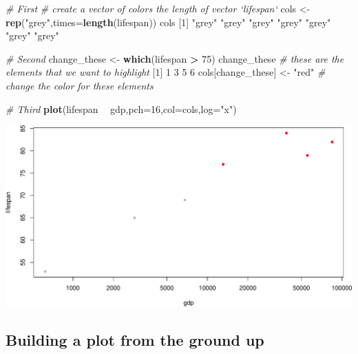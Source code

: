 \documentclass[]{book}
\newenvironment{Shaded}{\begin{snugshade}}{\end{snugshade}}
\newcommand{\CommentTok}[1]{\textcolor[rgb]{0.56,0.35,0.01}{\textit{#1}}}
\newcommand{\DataTypeTok}[1]{\textcolor[rgb]{0.13,0.29,0.53}{#1}}
\newcommand{\DecValTok}[1]{\textcolor[rgb]{0.00,0.00,0.81}{#1}}
\newcommand{\KeywordTok}[1]{\textcolor[rgb]{0.13,0.29,0.53}{\textbf{#1}}}
\newcommand{\NormalTok}[1]{#1}
\newcommand{\OperatorTok}[1]{\textcolor[rgb]{0.81,0.36,0.00}{\textbf{#1}}}
\newcommand{\StringTok}[1]{\textcolor[rgb]{0.31,0.60,0.02}{#1}}
\begin{document}
\begin{Shaded}
\begin{Highlighting}[]
\CommentTok{# First}
\CommentTok{# create a vector of colors the length of vector `lifespan`}
\NormalTok{cols <-}\StringTok{ }\KeywordTok{rep}\NormalTok{(}\StringTok{"grey"}\NormalTok{,}\DataTypeTok{times=}\KeywordTok{length}\NormalTok{(lifespan)) }
\NormalTok{cols}
\NormalTok{[}\DecValTok{1}\NormalTok{] }\StringTok{"grey"} \StringTok{"grey"} \StringTok{"grey"} \StringTok{"grey"} \StringTok{"grey"} \StringTok{"grey"} \StringTok{"grey"}

\CommentTok{# Second}
\NormalTok{change_these <-}\StringTok{ }\KeywordTok{which}\NormalTok{(lifespan }\OperatorTok{>}\StringTok{ }\DecValTok{75}\NormalTok{) }
\NormalTok{change_these }\CommentTok{# these are the elements that we want to highlight}
\NormalTok{[}\DecValTok{1}\NormalTok{] }\DecValTok{1} \DecValTok{3} \DecValTok{5} \DecValTok{6}
\NormalTok{cols[change_these] <-}\StringTok{ "red"}  \CommentTok{# change the color for these elements }

\CommentTok{# Third}
\KeywordTok{plot}\NormalTok{(lifespan }\OperatorTok{~}\StringTok{ }\NormalTok{gdp,}\DataTypeTok{pch=}\DecValTok{16}\NormalTok{,}\DataTypeTok{col=}\NormalTok{cols,}\DataTypeTok{log=}\StringTok{"x"}\NormalTok{)}
\end{Highlighting}
\end{Shaded}

\includegraphics{figures/unnamed-chunk-618-1.pdf}

\hypertarget{building-a-plot-from-the-ground-up}{%
\subsection*{Building a plot from the ground up}\label{building-a-plot-from-the-ground-up}}
\end{document}
